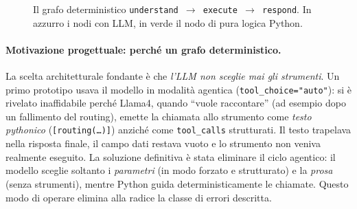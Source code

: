 \documentclass[11pt,a4paper]{article}
\begin{document}
\begin{figure}[h]
\centering
\caption{Il grafo deterministico \texttt{understand $\rightarrow$ execute
$\rightarrow$ respond}. In azzurro i nodi con LLM, in verde il nodo di pura
logica Python.}
\label{fig:graph}
\end{figure}

\paragraph{Motivazione progettuale: perché un grafo deterministico.}
La scelta architetturale fondante è che \emph{l'LLM non sceglie mai gli
strumenti}. Un primo prototipo usava il modello in modalità agentica
(\texttt{tool\_choice="auto"}): si è rivelato inaffidabile perché Llama4, quando
``vuole raccontare'' (ad esempio dopo un fallimento del routing), emette la
chiamata allo strumento come \emph{testo pythonico} (\texttt{[routing(\dots)]})
anziché come \texttt{tool\_calls} strutturati. Il testo trapelava nella risposta
finale, il campo dati restava vuoto e lo strumento non veniva realmente
eseguito. La soluzione definitiva è stata eliminare il ciclo agentico: il
modello sceglie soltanto i \emph{parametri} (in modo forzato e strutturato) e la
\emph{prosa} (senza strumenti), mentre Python guida deterministicamente le
chiamate. Questo modo di operare elimina alla radice la classe di errori
descritta.
\end{document}
